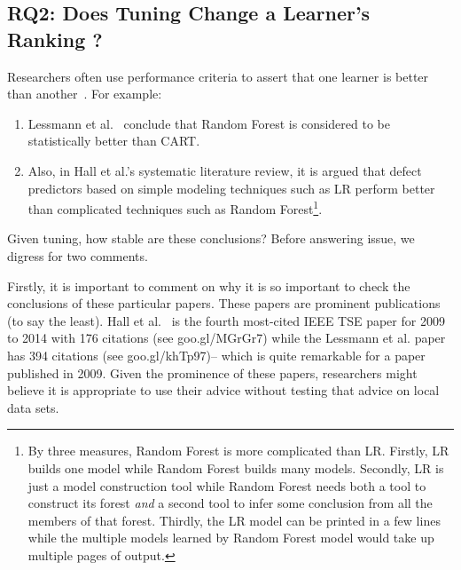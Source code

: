 \documentclass[smallextended]{svjour3}
\newcommand{\be}{\begin{enumerate}}
\newcommand{\ee}{\end{enumerate}}
\begin{document}
\subsection{RQ2:  Does Tuning Change a Learner's Ranking ?}\label{sect:rank}
Researchers often use performance criteria to assert that one learner is better than 
another~\cite{lessmann2008benchmarking,me07b,hall11}. For example:
\be
\item
Lessmann et al.~\cite{lessmann2008benchmarking} conclude that
Random Forest is considered to be statistically 
better than CART. 
\item
Also, in Hall et al.'s   systematic literature review\cite{hall11}, it is argued
that defect predictors based on simple 
modeling techniques such as LR perform better than complicated techniques such as Random Forest\footnote{By three measures,
Random Forest
is more complicated than LR. Firstly, LR builds one model
while Random Forest builds many models. Secondly, LR is just
a model construction tool while Random Forest needs both
a tool to construct its forest {\em and} a second tool
to  infer some conclusion from all the members of that forest.
Thirdly, the LR model can be printed in a few lines while the multiple
models learned by Random
Forest model would take up multiple pages of output.}.
\ee
Given tuning, how stable are these  conclusions?
Before answering issue, we digress for two comments.



Firstly, it is important to comment on why it is  so important to check the conclusions
of these particular papers. 
These  papers are prominent publications (to say the least).
Hall et al.~\cite{hall11} is the fourth most-cited IEEE TSE
paper for 2009 to 2014 with 176 citations (see goo.gl/MGrGr7)
while the Lessmann et al. paper~\cite{lessmann2008benchmarking} has 394 citations (see
goo.gl/khTp97)-- which is quite remarkable for a paper published in 2009.
Given the prominence
of these papers, researchers might believe it is
appropriate to
  use  their advice without testing that advice on local data sets.
\end{document}
